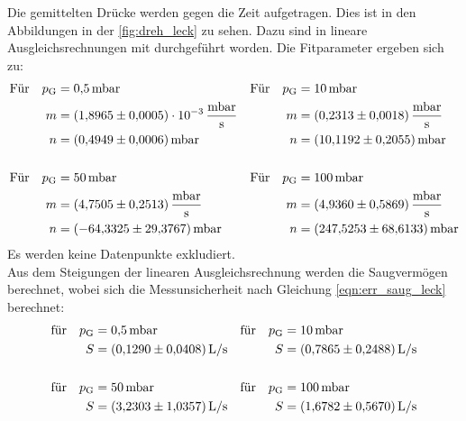     \noindent Die gemittelten Drücke werden gegen die Zeit aufgetragen. Dies ist in den Abbildungen in der \autoref{fig:dreh_leck} zu sehen. Dazu sind in lineare Ausgleichsrechnungen 
    mit \cite{scipy} durchgeführt worden. Die Fitparameter ergeben sich zu:
    \begin{align*}
      \text{Für} \quad  p_\text{G} &= \SI{0.5}{\milli\bar} & \text{Für} \quad  p_\text{G} &= \SI{10}{\milli\bar}\\
      m &= \SI{1.8965(5)e-3}{\milli\bar\per\second} & m &= \SI{0.2313 \pm 0.0018}{\milli\bar\per\second} \\
      n &= \SI{0.4949 \pm 0.0006}{\milli\bar} & n &= \SI{10.1192 \pm 0.2055}{\milli\bar} \\
      \\
      \text{Für} \quad  p_\text{G} &= \SI{50}{\milli\bar} & \text{Für} \quad  p_\text{G} &= \SI{100}{\milli\bar}\\
      m &= \SI{4.7505 \pm 0.2513}{\milli\bar\per\second} & m &= \SI{4.9360 \pm 0.5869}{\milli\bar\per\second} \\
      n &= \SI{-64.3325 \pm 29.3767}{\milli\bar} & n &= \SI{247.5253 \pm 68.6133}{\milli\bar} 
    \end{align*}
    Es werden keine Datenpunkte exkludiert. \\
    Aus dem Steigungen der linearen Ausgleichsrechnung werden die Saugvermögen berechnet, wobei sich die Messunsicherheit nach Gleichung \eqref{eqn:err_saug_leck} berechnet:
    \begin{align*}
      \text{für} \quad p_\text{G} &= \SI{0.5}{\milli\bar} & \text{für} \quad p_\text{G} &= \SI{10}{\milli\bar} \\
      S &= \SI{0.1290 \pm 0.0408}{L\per\second}  & S &= \SI{0.7865 \pm 0.2488}{L\per\second}  \\
      \\
      \text{für} \quad p_\text{G} &= \SI{50}{\milli\bar} & \text{für} \quad p_\text{G} &= \SI{100}{\milli\bar} \\
      S &= \SI{3.2303 \pm 1.0357}{L\per\second}  & S &= \SI{1.6782 \pm 0.5670}{L\per\second}  
    \end{align*}

